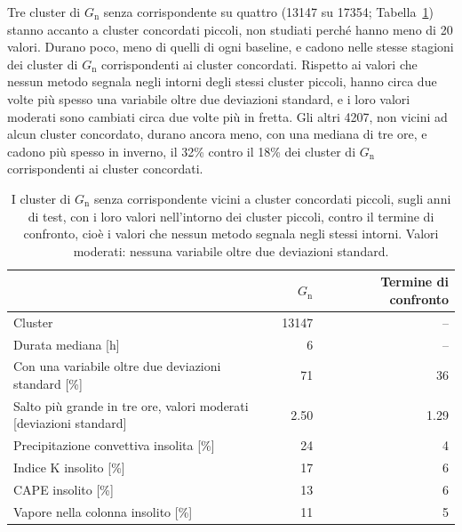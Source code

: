 Tre cluster di $G_{\mathrm{n}}$ senza corrispondente su quattro (13147 su 17354; Tabella~\ref{tab:ris-senza-corrispondente}) stanno accanto a cluster concordati piccoli, non studiati perché hanno meno di 20 valori. Durano poco, meno di quelli di ogni baseline, e cadono nelle stesse stagioni dei cluster di $G_{\mathrm{n}}$ corrispondenti ai cluster concordati. Rispetto ai valori che nessun metodo segnala negli intorni degli stessi cluster piccoli, hanno circa due volte più spesso una variabile oltre due deviazioni standard, e i loro valori moderati sono cambiati circa due volte più in fretta. Gli altri 4207, non vicini ad alcun cluster concordato, durano ancora meno, con una mediana di tre ore, e cadono più spesso in inverno, il 32\% contro il 18\% dei cluster di $G_{\mathrm{n}}$ corrispondenti ai cluster concordati.

\begin{table}[!t]
    \centering
    \footnotesize
    \caption{I cluster di $G_{\mathrm{n}}$ senza corrispondente vicini a cluster concordati piccoli, sugli anni di test, con i loro valori nell'intorno dei cluster piccoli, contro il termine di confronto, cioè i valori che nessun metodo segnala negli stessi intorni. Valori moderati: nessuna variabile oltre due deviazioni standard.}
    \label{tab:ris-senza-corrispondente}
    \vspace{0.6em}
    \begin{tabular}{@{}lrr@{}}
        \toprule
         & $G_{\mathrm{n}}$ & Termine di confronto \\
        \midrule
        Cluster & 13147 & -- \\
        Durata mediana [h] & 6 & -- \\
        Con una variabile oltre due deviazioni standard [\%] & 71 & 36 \\
        \shortstack[l]{Salto più grande in tre ore, valori moderati\\{}[deviazioni standard]} & 2.50 & 1.29 \\
        Precipitazione convettiva insolita [\%] & 24 & 4 \\
        Indice K insolito [\%] & 17 & 6 \\
        CAPE insolito [\%] & 13 & 6 \\
        Vapore nella colonna insolito [\%] & 11 & 5 \\
        \bottomrule
    \end{tabular}
\end{table}

